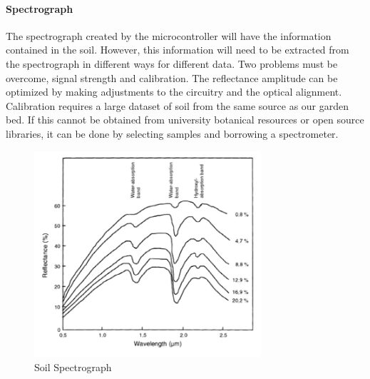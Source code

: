 \paragraph{Spectrograph} The spectrograph created by the microcontroller will have the information contained in the soil. However, this information will need to be extracted from the spectrograph in different ways for different data. Two problems must be overcome, signal strength and calibration. The reflectance amplitude can be optimized by making adjustments to the circuitry and the optical alignment. Calibration requires a large dataset of soil from the same source as our garden bed. If this cannot be obtained from university botanical resources or open source libraries, it can be done by selecting samples and borrowing a spectrometer.

\begin{figure}[H]
    \caption{Soil Spectrograph}
    \centering
    \includegraphics[width=0.75\textwidth]{images/GenericSoilSpectra.png}
\end{figure}

